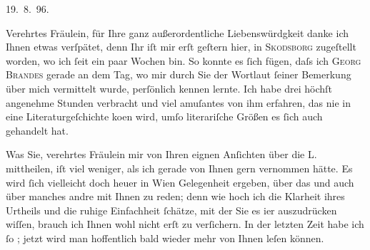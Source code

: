 \pstart
           \raggedleft{}19. 8. 96.\pend
           
\pstart{}Verehrtes Fräulein,\pend\vspace{0.5em}
\pstart
           für Ihre ganz außerordentliche Liebenswürdgkeit danke ich Ihnen etwas verſpätet, denn
               Ihr \label{K_L04328-1v}\label{K_L04328-1} iſt mir erſt geſtern hier,
               in \textsc{Skodsborg} zugeſtellt worden, wo ich{ }ſeit ein paar Wochen bin. So konnte es{ }ſich fügen, daſs ich \textsc{Georg Brandes} gerade an dem Tag, wo mir durch Sie {\pb}der Wortlaut{ }ſeiner Bemerkung über mich vermittelt
               wurde, perſönlich kennen lernte. Ich habe \label{K_L04328-2v}\label{K_L04328-2} drei
               höchſt angenehme Stunden verbracht und viel amuſantes von ihm erfahren, das nie in
               eine Literaturgeſchichte ko{\geminationm}en wird, umſo literariſche
               Größen es{ }ſich auch gehandelt hat.\pend
           
\pstart
           Was Sie, verehrtes Fräulein {\pb}mir von Ihren eignen Anſichten über die L. mittheilen, iſt viel weniger, als ich gerade von
               Ihnen gern vernommen hätte. Es wird{ }ſich vielleicht doch heuer in Wien Gelegenheit ergeben, 
               über das und auch über manches andre mit Ihnen zu reden; denn
               wie hoch ich die Klarheit ihres Urtheils und die ruhige Einfachheit{ }ſchätze, mit der
               Sie es i{\geminationm}er {\pb}auszudrücken wiſſen, brauch ich Ihnen
               wohl nicht erſt zu verſichern. In der letzten Zeit habe ich{ }ſo \label{K_L04328-3v}\label{K_L04328-3}; jetzt wird man hoffentlich \introOben{}bald\introOben{} wieder mehr von Ihnen leſen können.\pend
           
